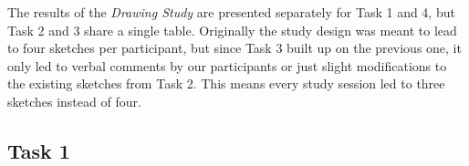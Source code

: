 The results of the \textit{Drawing Study} are presented separately for Task 1 and 4, but Task 2 and 3 share a single table. Originally the study design was meant to lead to four sketches per participant, but since Task 3 built up on the previous one, it only led to verbal comments by our participants or just slight modifications to the existing sketches from Task 2. This means every study session led to three sketches instead of four.

\subsection*{Task 1}

\begin{table}[H]
	\centering
	\caption{\textit{This table shows the results of the first task of the Drawing Study. The first row of numbers shows the respective counts of every category. The \textbf{Explicit...} category is further split up into its four sub-categories and their respective counts.}}
	\label{tb:t1}
\end{table}

